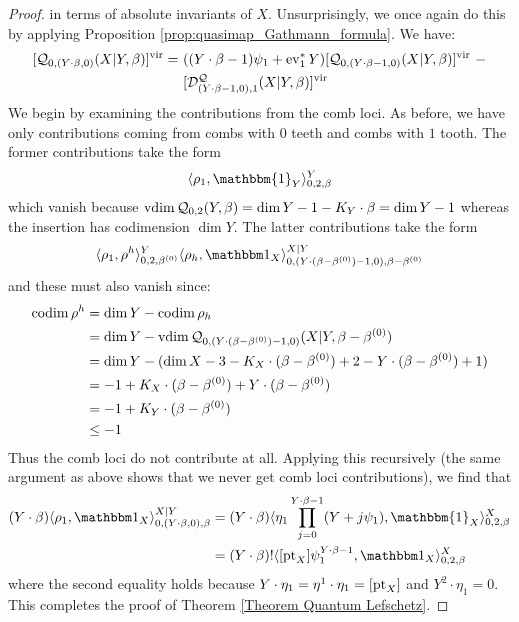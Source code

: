 \begin{proof}
in terms of absolute invariants of $X$. Unsurprisingly, we once again do this by applying Proposition \ref{prop:quasimap_Gathmann_formula}. We have:
\begin{align*} [\mathcal{Q}_{0,(Y \cdot \beta,0)}(X|Y,\beta)]^{\mathrm{vir}} = \ & ((Y\cdot\beta-1)\psi_1+\operatorname{ev}_1^*Y) [\mathcal{Q}_{0,(Y\cdot\beta-1,0)}(X|Y,\beta)]^{\mathrm{vir}} \ - \\
& [\mathcal{D}_{(Y\cdot\beta-1,0),1}^{\mathcal Q}(X|Y,\beta)]^{\mathrm{vir}} \end{align*}
We begin by examining the contributions from the comb loci. As before, we have only contributions coming from combs with $0$ teeth and combs with $1$ tooth. The former contributions take the form
\begin{equation*} \langle \rho_1 , \mathbbm{1}_Y \rangle_{0,2,\beta}^Y \end{equation*}
which vanish because $\operatorname{vdim}{\mathcal{Q}_{0,2}(Y,\beta)} = \dim Y -1 -K_Y\cdot\beta = \dim Y -1$ whereas the insertion has codimension $\dim Y$. The latter contributions take the form
\begin{equation*} \langle \rho_1 ,\rho^h\rangle_{0,2,\beta^{(0)}}^Y \langle \rho_h,\mathbbm 1_{X}\rangle_{0,(Y\cdot(\beta-\beta^{(0)})-1,0),\beta-\beta^{(0)}}^{X|Y}\end{equation*}
and these must also vanish since:
\begin{align*} \operatorname{codim} \rho^h & = \dim Y - \operatorname{codim} \rho_h \\
& = \dim Y - \operatorname{vdim} \mathcal{Q}_{0,(Y\cdot(\beta-\beta^{(0)})-1,0)}(X|Y,\beta-\beta^{(0)}) \\
& = \dim Y - (\dim X - 3 - K_X \cdot (\beta - \beta^{(0)}) + 2 - Y \cdot (\beta - \beta^{(0)}) + 1) \\
&= -1 + K_X \cdot (\beta-\beta^{(0)}) + Y \cdot (\beta-\beta^{(0)}) \\
& = -1 + K_Y\cdot(\beta-\beta^{(0)}) \\
& \leq -1
\end{align*}
Thus the comb loci do not contribute at all. Applying this recursively (the same argument as above shows that we never get comb loci contributions), we find that
\begin{align*}
(Y\cdot\beta)\langle \rho_1 ,\mathbbm 1_{X}\rangle_{0,(Y\cdot\beta,0),\beta}^{X|Y} & = (Y\cdot\beta) \langle \eta_1 \prod_{j=0}^{Y\cdot\beta-1}(Y+j\psi_1) , \mathbbm{1}_X \rangle_{0,2,\beta}^X \\
& = (Y\cdot\beta)!\langle[ \pt_X]\psi_1^{Y\cdot\beta-1},\mathbbm 1_X\rangle_{0,2,\beta}^X
\end{align*}
where the second equality holds because $Y\cdot\eta_1=\eta^1 \cdot \eta_1 = [\operatorname{pt}_X]$ and $Y^2\cdot\eta_1=0$. This completes the proof of Theorem \ref{Theorem Quantum Lefschetz}. \end{proof}

